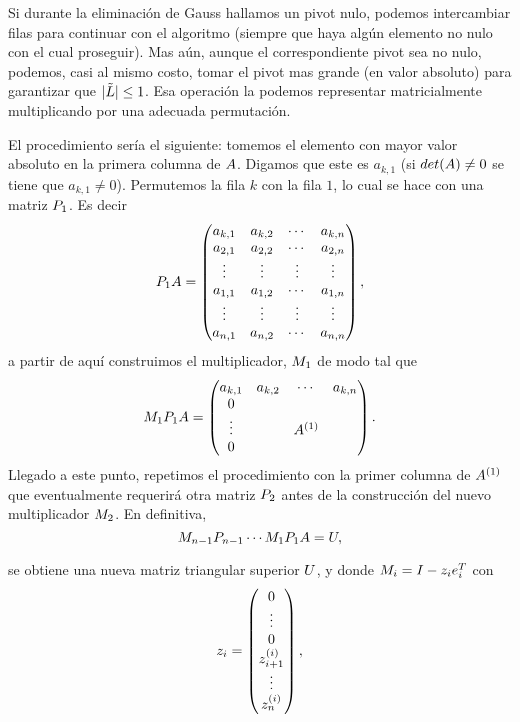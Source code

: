 \begin{tcolorbox}
Si durante la eliminación de Gauss hallamos un pivot nulo, podemos intercambiar filas para continuar con el algoritmo (siempre que haya algún elemento no nulo con el cual proseguir). Mas aún, aunque el correspondiente pivot sea no nulo, podemos,  casi al mismo costo, tomar el pivot mas grande (en valor absoluto) para  garantizar que $|\tilde\Lb|\le 1$.  Esa operación la podemos representar matricialmente multiplicando por una adecuada permutación.

El procedimiento sería el siguiente: tomemos el elemento con mayor valor absoluto en la primera columna de $\Ab$. Digamos que este es $a_{k,1}$ (si $det(\Ab)\neq 0$ se tiene que $a_{k,1}\neq 0$). Permutemos la fila $k$ con la fila $1$, lo cual se hace con una matriz $\Pb_1$. Es decir
$$
\Pb_1\Ab=
\begin{pmatrix}
 a_{k,1}&a_{k,2}&\cdots &a_{k,n}\\
 a_{2,1}&a_{2,2}&\cdots &a_{2,n}\\
  \vdots&\vdots&\vdots&\vdots\\
 a_{1,1}&a_{1,2}&\cdots &a_{1,n}\\
 \vdots&\vdots&\vdots&\vdots \\
 a_{n,1}&a_{n,2}&\cdots &a_{n,n}
\end{pmatrix},
$$
a partir de aquí construimos el multiplicador, $\Mb_1$ de modo tal que
$$
\Mb_1\Pb_1\Ab=
\begin{pmatrix}
 a_{k,1}&a_{k,2}&\cdots &a_{k,n}\\
 0&&&\\
  \vdots&&\Ab^{(1)}&\\
 0&&&\\

\end{pmatrix}.
$$
Llegado a este punto, repetimos el procedimiento con la primer columna de $\Ab^{(1)}$ que eventualmente requerirá otra matriz $\Pb_2$ antes de la construcción del nuevo multiplicador $\Mb_2$. En definitiva,
\begin{equation}
 \label{eq:factoresPLU}
\Mb_{n-1}\Pb_{n-1}\cdots \Mb_{1}\Pb_{1}\Ab=\Ub,
 \end{equation}


se obtiene una nueva matriz triangular superior $\Ub$, y donde
$\Mb_i=\Ib-\zb_i\eb_i^T$ con
$$
\zb_i=
\begin{pmatrix}
 0\\
 \vdots\\
 0\\
 z_{i+1}^{(i)}\\
 \vdots \\
 z_n^{(i)}
\end{pmatrix},
$$



\end{tcolorbox}
